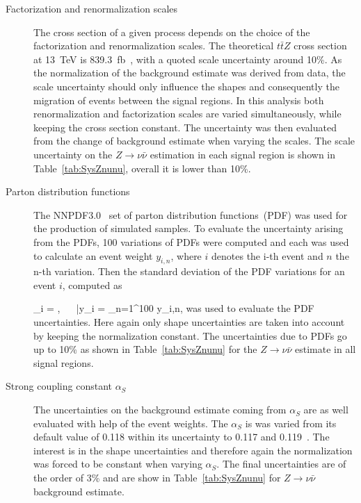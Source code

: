 \begin{description}
\item[Factorization and renormalization scales]
The cross section of a given process depends on the choice of the factorization and renormalization scales. The theoretical $t\bar{t}Z$ cross section at 13~TeV is 839.3~fb~\cite{deFlorian:2016spz}, with a quoted scale uncertainty around 10\%. As the normalization of the background estimate was derived from data, the scale uncertainty should only influence the shapes and consequently the migration of events between the signal regions. In this analysis both renormalization and factorization scales are varied simultaneously, while keeping the cross section constant. The uncertainty was then evaluated from the change of background estimate when varying the scales. The scale uncertainty on the $Z \to \nu \bar{\nu}$ estimation in each signal region is shown in Table~\ref{tab:SysZnunu}, overall it is lower than 10\%.


\item[Parton distribution functions]
The NNPDF3.0~\cite{Ball:2014uwa} set of parton distribution functions~(PDF) was used for the production of simulated samples. To evaluate the uncertainty arising from the PDFs, 100 variations of PDFs were computed and each was used to calculate an event weight $y_{i,n}$, where $i$ denotes the i-th event and $n$ the n-th variation. Then the standard deviation of the PDF variations for an event $i$, computed as

{
\sigma_{i} = , ~~ \bar{y}_{i} =  \sum_{n=1}^{100} y_{i,n},
}
was used to evaluate the PDF uncertainties. Here again only shape uncertainties are taken into account by keeping the normalization constant. The uncertainties due to PDFs go up to 10\% as shown in Table~\ref{tab:SysZnunu} for the $Z \to \nu \bar{\nu}$ estimate in all signal regions.

\item[Strong coupling constant $\alpha_{S}$]
The uncertainties on the background estimate coming from $\alpha_{S}$ are as well evaluated with help of the event weights. The $\alpha_{S}$ is was varied from its default value of 0.118  within its uncertainty to 0.117 and 0.119~\cite{Patrignani:2016xqp}.  The interest is in the shape uncertainties and therefore again the normalization was forced to be constant when varying $\alpha_{S}$. The final uncertainties are of the order of 3\% and are show in Table~\ref{tab:SysZnunu} for $Z \to \nu \bar{\nu}$ background estimate.
\end{description}

